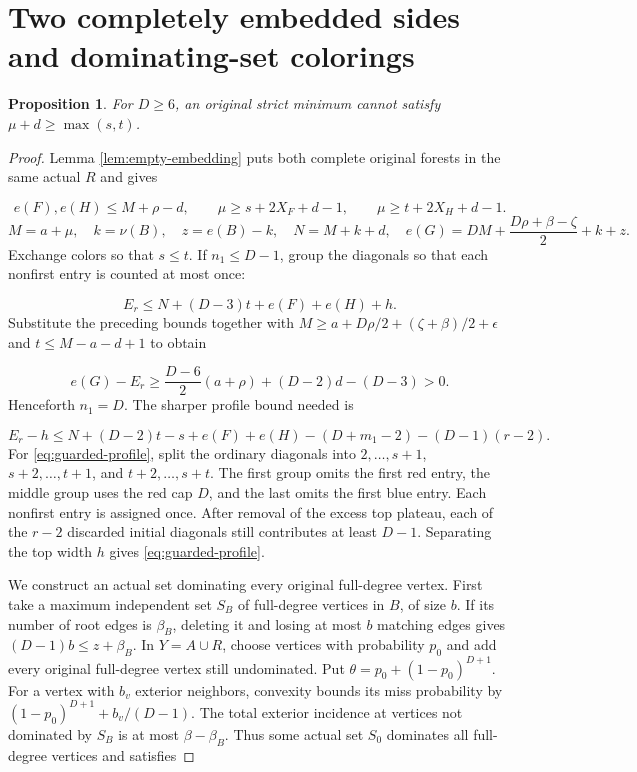 \documentclass[11pt,a4paper]{article}
\newtheorem{proposition}[theorem]{Proposition}
\theoremstyle{definition}
\begin{document}
\section{Two completely embedded sides and dominating-set colorings}\label{app:guarded}
\begin{proposition}\label{prop:guarded}
For $D\ge6$, an original strict minimum cannot satisfy $\mu+d\ge\max(s,t)$.
\end{proposition}
\begin{proof}
Lemma \ref{lem:empty-embedding} puts both complete original forests in the same actual $R$ and gives

\[
 e(F),e(H)\le M+\rho-d,\qquad
 \mu\ge s+2X_F+d-1,\qquad
 \mu\ge t+2X_H+d-1.
\]
\[
 M=a+\mu,\quad k=\nu(B),\quad z=e(B)-k,\quad
 N=M+k+d,\quad
 e(G)=DM+\frac{D\rho+\beta-\zeta}{2}+k+z.
\]
Exchange colors so that $s\le t$.
If $n_1\le D-1$, group the diagonals so that each nonfirst entry is counted at most once:

\[
 E_r\le N+(D-3)t+e(F)+e(H)+h.
\]
Substitute the preceding bounds together with
$M\ge a+D\rho/2+(\zeta+\beta)/2+\epsilon$ and
$t\le M-a-d+1$ to obtain

\[
 e(G)-E_r\ge\frac{D-6}{2}(a+\rho)+(D-2)d-(D-3)>0.
\]
Henceforth $n_1=D$. The sharper profile bound needed is

\begin{equation}\label{eq:guarded-profile}
 E_r-h\le
 N+(D-2)t-s+e(F)+e(H)
 -(D+m_1-2)-(D-1)(r-2).
\end{equation}
For \eqref{eq:guarded-profile}, split the ordinary diagonals into
$2,\ldots,s+1$, $s+2,\ldots,t+1$, and $t+2,\ldots,s+t$.
The first group omits the first red entry, the middle group uses the red cap $D$, and the last omits the first blue entry.
Each nonfirst entry is assigned once.
After removal of the excess top plateau, each of the $r-2$ discarded initial diagonals still contributes at least $D-1$.
Separating the top width $h$ gives \eqref{eq:guarded-profile}.

We construct an actual set dominating every original full-degree vertex.
First take a maximum independent set $S_B$ of full-degree vertices in $B$, of size $b$.
If its number of root edges is $\beta_B$, deleting it and losing at most $b$ matching edges gives
$(D-1)b\le z+\beta_B$.
In $Y=A\cup R$, choose vertices with probability $p_0$ and add every original full-degree vertex still undominated.
Put $\theta=p_0+(1-p_0)^{D+1}$.
For a vertex with $b_v$ exterior neighbors, convexity bounds its miss probability by
$(1-p_0)^{D+1}+b_v/(D-1)$.
The total exterior incidence at vertices not dominated by $S_B$ is at most $\beta-\beta_B$.
Thus some actual set $S_0$ dominates all full-degree vertices and satisfies


\end{proof}
\end{document}
